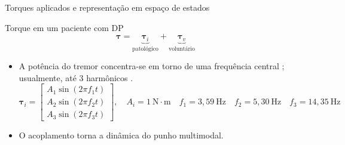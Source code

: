 \begin{frame}{Torques aplicados e representação em espaço de estados}
  \begin{block}{Torque em um paciente com DP \cite{Qi:2024}}
    \vspace{-0.3cm}
    \begin{equation*}
      \bm{\tau} = \underbrace{\bm{\tau}_i}_{\text{patológico}} + \underbrace{\bm{\tau}_v}_{\text{voluntário}}
    \end{equation*}
  \end{block}
  \begin{itemize}[<+->]
    \item A potência do tremor concentra-se em torno de uma frequência central \cite{Deuschl:2022}; usualmente, até 3 harmônicos \cite{Zamanian:2019,Albuquerque:2025}.
    \begin{equation*}
      \bm{\tau}_i =
      \begin{bmatrix}
        A_1\sin(2\pi f_1 t) \\
        A_2\sin(2\pi f_2 t) \\
        A_3\sin(2\pi f_3 t)
      \end{bmatrix},
      \quad
      A_i = 1~\text{N}\cdot\text{m} \quad
      f_1 = 3{,}59~\text{Hz} \quad
      f_2 = 5{,}30~\text{Hz} \quad
      f_3 = 14{,}35~\text{Hz}
    \end{equation*}

    \item O acoplamento torna a dinâmica do punho multimodal.
  \end{itemize}
\end{frame}

